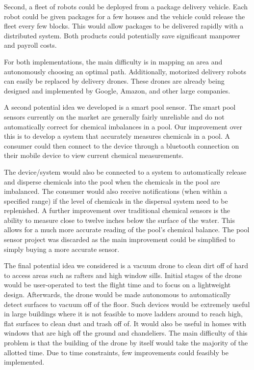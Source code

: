 \documentclass[11pt]{IEEEtran}
\begin{document}
		Second, a fleet of robots could be deployed from a package delivery vehicle. Each robot could be given packages for a few houses and the vehicle could release the fleet every few blocks. This would allow packages to be delivered rapidly with a distributed system. Both products could potentially save significant manpower and payroll costs.

		For both implementations, the main difficulty is in mapping an area and autonomously choosing an optimal path. Additionally, motorized delivery robots can easily be replaced by delivery drones. These drones are already being designed and implemented by Google, Amazon, and other large companies. 

		A second potential idea we developed is a smart pool sensor. The smart pool sensors currently on the market are generally fairly unreliable and do not automatically correct for chemical imbalances in a pool. Our improvement over this is to develop a system that accurately measures chemicals in a pool. A consumer could then connect to the device through a bluetooth connection on their mobile device to view current chemical measurements. 

		The device/system would also be connected to a system to automatically release and disperse chemicals into the pool when the chemicals in the pool are imbalanced. The consumer would also receive notifications (when within a specified range) if the level of chemicals in the dispersal system need to be replenished. A further improvement over traditional chemical sensors is the ability to measure close to twelve inches below the surface of the water. This allows for a much more accurate reading of the pool’s chemical balance. The pool sensor project was discarded as the main improvement could be simplified to simply buying a more accurate sensor. 

		The final potential idea we considered is a vacuum drone to clean dirt off of hard to access areas such as rafters and high window sills. Initial stages of the drone would be user-operated to test the flight time and to focus on a lightweight design. Afterwards, the drone would be made autonomous to automatically detect surfaces to vacuum off of the floor. Such devices would be extremely useful in large buildings where it is not feasible to move ladders around to reach high, flat surfaces to clean dust and trash off of. It would also be useful in homes with windows that are high off the ground and chandeliers. The main difficulty of this problem is that the building of the drone by itself would take the majority of the allotted time. Due to time constraints, few improvements could feasibly be implemented. 
\end{document}
